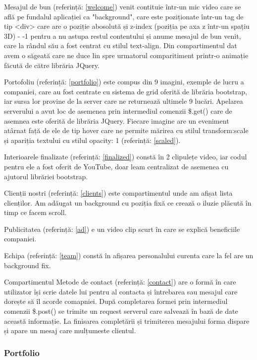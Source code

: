 Mesajul de bun (referință: \ref{welcome}) venit contituie într-un mic video care se află pe fundalul aplicației ca "background", care este poziționate într-un tag de tip <div> care are o poziție abosolută și z-index (poziția pe axa z într-un spațiu 3D) - -1 pentru a nu astupa restul contentului și anume mesajul de bun venit, care la rândul său a fost centrat cu stilul text-align. Din compartimentul dat avem o săgeată care ne duce lin spre urmatorul comparitiment printr-o animație făcută de către librăria JQuery\cite{jquery}.

Portofoliu (referință: \ref{portfolio}) este compus din 9 imagini, exemple de lucru a companiei, care au fost centrate cu sistema de grid oferită de librăria bootstrap\cite{boostrap}, iar sursa lor provine de la server care ne returnează ultimele 9 lucări. Apelarea serverului a avut loc de asemenea prin intermediul comenzii \$.get()\cite{get-method} care de asemnea este oferită de librăria JQuery. Fiecare imagine are un eveniment atârnat față de ele de tip hover care ne permite mărirea cu stilul transform:scale și apariția textului cu stilul opacity: 1 (referință: \ref{scaled}).

Interioarele finalizate (referință: \ref{finalized}) constă în 2 clipulețe video, iar codul pentru ele a fost oferit de YouTube, doar leam centralizat de asemenea cu ajutorul librăriei bootstrap.

Clienții nostri (referință: \ref{clients}) este compartimentul unde am afișat lista clienților. Am adăugat un background cu poziția fixă ce crează o iluzie plăcută în timp ce facem scroll.

Publicitatea (referință: \ref{ad}) e un video clip scurt în care se explică beneficiile companiei.

Echipa (referință: \ref{team}) constă în afișarea personalului curenta care la fel are un background fix.

Compartimentul Metode de contact (referință: \ref{contact}) are o formă în care utilizator își scrie datele lui pentru al contacta și întrebarea sau mesajul care dorește să îl acorde comapniei. După completarea formei prin intermediul comenzii \$.post() se trimite un request serverul care salvează în bază de date această informație. La finisarea completării și trimiterea mesajului forma dispare și apare un mesaj care mulțumeste clientul.

\subsubsection{Portfolio}

